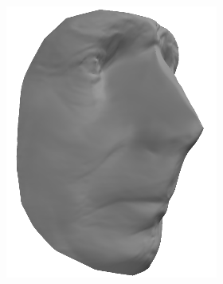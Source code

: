\begin{figure}
\begin{subfigure}{0.23\textwidth}
    \end{subfigure}
    \begin{subfigure}{0.23\textwidth}
        \centering
        \includegraphics[width=\textwidth]{statistical_normals/images/gsfs_results/celebrities/samuel_beckett_spherical.png}
\label{fig:samuel-beckett-no-texture}
    \end{subfigure}
    \begin{subfigure}{0.23\textwidth}
        \centering

\end{subfigure}
\end{figure}
